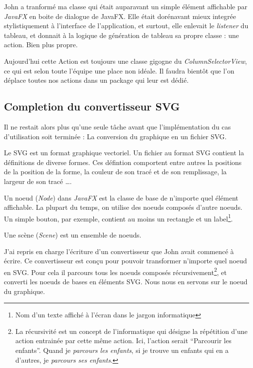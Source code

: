 John a tranformé ma classe qui était auparavant un simple élément affichable par \textit{JavaFX} en boite de dialogue de JavaFX. Elle était dorénavant mieux integrée stylistiquement à l'interface de l'application, et surtout, elle enlevait le \textit{listener} du tableau, et donnait à la logique de génération de tableau sa propre classe : une action. Bien plus propre.

Aujourd'hui cette Action est toujours une classe gigogne du \textit{ColumnSelectorView}, ce qui est selon toute l'équipe une place non idéale. Il faudra bientôt que l'on déplace toutes nos actions dans un package qui leur est dédié.

%
%
\subsection{Completion du convertisseur SVG}
Il ne restait alors plus qu'une seule tâche avant que l'implémentation du cas d'utilisation soit terminée : La conversion du graphique en un fichier SVG.

\begin{center}
Le SVG est un format graphique vectoriel. Un fichier au format SVG contient la définitions de diverse formes. Ces défintion comportent entre autres la positions de la position de la forme, la couleur de son tracé et de son remplissage, la largeur de son tracé \ldots.
\end{center}

\begin{center}
Un noeud (\textit{Node}) dans \textit{JavaFX} est la classe de base de n'importe quel élément affichable. La plupart du temps, on utilise des noeuds composés d'autre noeuds. Un simple bouton, par exemple, contient au moins un rectangle et un label\footnote{Nom d'un texte affiché à l'écran dans le jargon informatique}.
\end{center}

\begin{center}
Une scène (\textit{Scene}) est un ensemble de noeuds.
\end{center}

J'ai repris en charge l'écriture d'un convertisseur que John avait commencé à écrire. Ce convertisseur est conçu pour pouvoir transformer n'importe quel noeud en SVG. Pour cela il parcours tous les noeuds composés récursivement\footnote{La récursivité est un concept de l'informatique qui désigne la répétition d'une action entrainée par cette même action. Ici, l'action serait ``Parcourir les enfants''. Quand je \emph{parcours les enfants}, si je trouve un enfants qui en a d'autres, je \emph{parcours ses enfants}.}, et converti les noeuds de bases en éléments SVG. Nous nous en servons sur le noeud du graphique.

